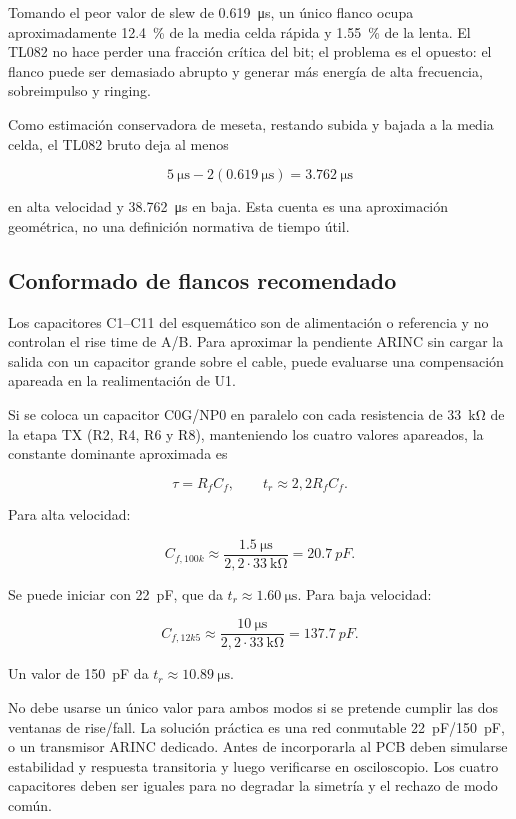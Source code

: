 \documentclass[11pt,a4paper]{article}
\begin{document}
Tomando el peor valor de slew de \SI{0.619}{\micro\second}, un único flanco
ocupa aproximadamente \SI{12.4}{\percent} de la media celda rápida y
\SI{1.55}{\percent} de la lenta. El TL082 no hace perder una fracción crítica
del bit; el problema es el opuesto: el flanco puede ser demasiado abrupto y
generar más energía de alta frecuencia, sobreimpulso y ringing.

Como estimación conservadora de meseta, restando subida y bajada a la media
celda, el TL082 bruto deja al menos

\[
 \SI{5}{\micro\second}-2(\SI{0.619}{\micro\second})
 =\SI{3.762}{\micro\second}
\]

en alta velocidad y \SI{38.762}{\micro\second} en baja. Esta cuenta es una
aproximación geométrica, no una definición normativa de tiempo útil.

\subsection{Conformado de flancos recomendado}

Los capacitores C1--C11 del esquemático son de alimentación o referencia y no
controlan el rise time de A/B. Para aproximar la pendiente ARINC sin cargar la
salida con un capacitor grande sobre el cable, puede evaluarse una compensación
apareada en la realimentación de U1.

Si se coloca un capacitor C0G/NP0 en paralelo con cada resistencia de
\SI{33}{\kilo\ohm} de la etapa TX (R2, R4, R6 y R8), manteniendo los cuatro
valores apareados, la constante dominante aproximada es

\[
 \tau=R_fC_f,\qquad t_r\approx2{,}2R_fC_f.
\]

Para alta velocidad:

\[
 C_{f,100k}\approx
 \frac{\SI{1.5}{\micro\second}}
 {2{,}2\cdot\SI{33}{\kilo\ohm}}
 =\SI{20.7}{pF}.
\]

Se puede iniciar con \SI{22}{pF}, que da $t_r\approx\SI{1.60}{\micro\second}$.
Para baja velocidad:

\[
 C_{f,12k5}\approx
 \frac{\SI{10}{\micro\second}}
 {2{,}2\cdot\SI{33}{\kilo\ohm}}
 =\SI{137.7}{pF}.
\]

Un valor de \SI{150}{pF} da $t_r\approx\SI{10.89}{\micro\second}$.

No debe usarse un único valor para ambos modos si se pretende cumplir las dos
ventanas de rise/fall. La solución práctica es una red conmutable
\SI{22}{pF}/\SI{150}{pF}, o un transmisor ARINC dedicado. Antes de incorporarla
al PCB deben simularse estabilidad y respuesta transitoria y luego verificarse
en osciloscopio. Los cuatro capacitores deben ser iguales para no degradar la
simetría y el rechazo de modo común.
\end{document}
